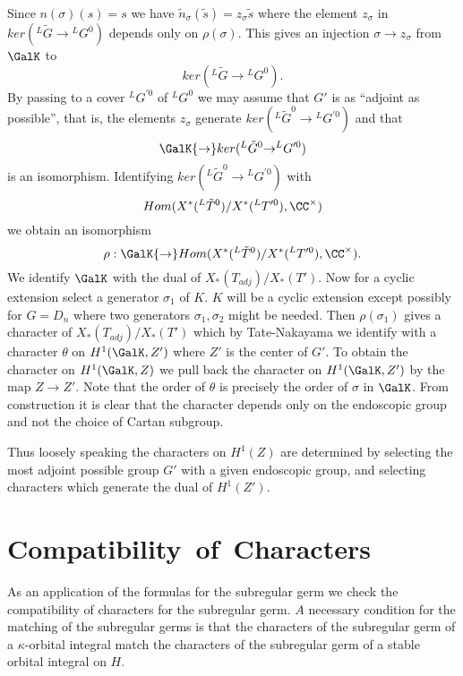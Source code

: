 \documentclass{memo-l}
\theoremstyle{definition}
\theoremstyle{remark}
\numberwithin{section}{chapter}
\numberwithin{equation}{chapter}
\begin{document}
   Since $n({\sigma})(s) = s$ we have $\tilde n _{{\sigma}}(\tilde s) 
= z_{{\sigma}}\tilde s $ where the element $z_{{\sigma}}$ in
$ker({}^{L}\tilde G {\to} {}^{L}G^{0})$ depends only on ${\rho }({\sigma})$.
This gives an injection ${\sigma} {\to} z_{{\sigma}}$ from $\GalK$ to
$$ker({}^{L}\tilde G {\to} {}^{L}G^{0}).$$  By passing to a cover ${}^{L}G^{\prime0}$ of
${}^{L}G^{0}$ we may assume that $G'$ is as ``adjoint as possible'', that is,
the elements $z_{{\sigma}}$ generate $ker({}^{L}\tilde G^{0} \to
{}^{L}G^{\prime0})$ and that $$\GalK {\to} ker({}^{L}\tilde G ^{0} {\to}
{}^{L}G^{\prime0})$$ is an isomorphism.  Identifying $ker({}^{L} \tilde G ^{0} {\to}
{}^{L}G^{\prime0})$ with $$Hom(X^{*}({}^{L}\tilde T ^{0})/X^{*}({}^{L}T^{\prime0}),
{\CC}^{\times})$$ we obtain an isomorphism 
$${\rho }:\GalK {\to}
Hom(X^{*}({}^{L}\tilde T ^{0})/X^{*}({}^{L}T^{\prime0}),
{\CC}^{\times}).$$  We
identify $\GalK$ with the dual of $X_{*}(T_{adj})/X_{*}(T')$.  Now for a cyclic
extension
select a generator ${\sigma}_{1}$ of $K$.  $K$ will be a cyclic extension
except possibly for $G = D_{n}$ where two generators
${\sigma}_{1},{\sigma}_{2}$ might be needed.  Then ${\rho }({\sigma}_{1})$
gives a character of $X_{*}(T_{adj})/X_{*}(T')$ which by Tate-Nakayama we
identify with a character ${\theta}$ on $H^{1}(\GalK,Z')$ where $Z'$ is
the center of $G'$.  To obtain the character on $H^{1}(\GalK,Z)$ we pull
back the character on $H^{1}(\GalK,Z')$ by the map $Z {\to} Z'$.  Note
that the order of ${\theta}$ is precisely the order of ${\sigma}$ in
$\GalK$.  From construction it is clear that the character depends only
on the endoscopic group and not the choice of Cartan subgroup.

   Thus loosely speaking the characters on $H^{1}(Z)$ are determined by
selecting the most adjoint possible group $G'$ with a given endoscopic
group, and selecting characters which generate the dual of $H^{1}(Z')$.




\section{Compatibility\ of\ Characters}

   As an application of the formulas for the subregular germ we check the
compatibility of characters for the subregular germ.  $A$ necessary
condition for the matching of the subregular germs is that the characters
of the subregular germ of a ${\kappa}$-orbital integral match the
characters of the subregular germ of a stable orbital integral on $H$.
\end{document}
